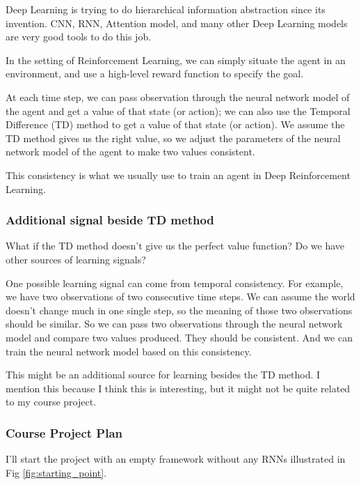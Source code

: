 Deep Learning is trying to do hierarchical information abstraction since its invention. 
CNN, RNN, Attention model, and many other Deep Learning models are very good tools to do this job.

In the setting of Reinforcement Learning, we can simply situate the agent in an environment, and use a high-level reward function to specify the goal.

At each time step, we can pass observation through the neural network model of the agent and get a value of that state (or action);
we can also use the Temporal Difference (TD) method to get a value of that state (or action).
We assume the TD method gives us the right value, so we adjust the parameters of the neural network model of the agent to make two values consistent.

This consistency is what we usually use to train an agent in Deep Reinforcement Learning.

\subsubsection{Additional signal beside TD method}
What if the TD method doesn't give us the perfect value function? Do we have other sources of learning signals?

One possible learning signal can come from temporal consistency.
For example, we have two observations of two consecutive time steps.
We can assume the world doesn't change much in one single step, so the meaning of those two observations should be similar.
So we can pass two observations through the neural network model and compare two values produced.
They should be consistent.
And we can train the neural network model based on this consistency.

This might be an additional source for learning besides the TD method. 
I mention this because I think this is interesting, but it might not be quite related to my course project.

\subsubsection{Course Project Plan}

I'll start the project with an empty framework without any RNNs illustrated in Fig \ref{fig:starting_point}.

